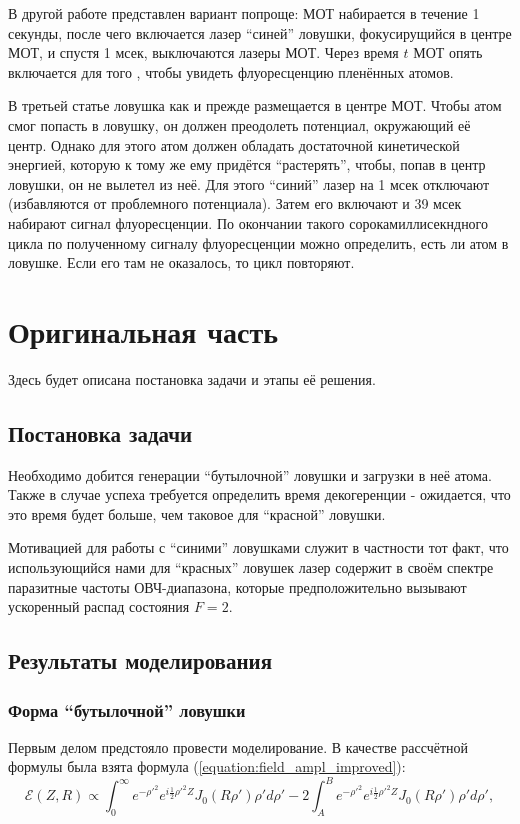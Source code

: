 \documentclass[12pt]{article}
\begin{document}
        В другой работе\cite{isenhower2009atom} представлен вариант попроще: МОТ набирается в течение 1 секунды,
        после чего включается лазер \enquote{синей} ловушки, фокусирущийся в центре МОТ, и спустя 1 мсек,
        выключаются лазеры МОТ. Через время $t$ МОТ опять включается для того , чтобы увидеть флуоресценцию
        пленённых атомов.

        В третьей статье\cite{xu2010trapping} ловушка как и прежде размещается в центре МОТ. Чтобы атом смог попасть
        в ловушку, он должен преодолеть потенциал, окружающий её центр. Однако для этого атом должен обладать
        достаточной кинетической энергией, которую к тому же ему придётся \enquote{растерять}, чтобы, попав в центр ловушки,
        он не вылетел из неё. Для этого \enquote{синий} лазер на 1 мсек отключают (избавляются от проблемного потенциала).
        Затем его включают и 39 мсек набирают сигнал флуоресценции. По окончании такого сорокамиллисекндного цикла
        по полученному сигналу флуоресценции можно определить, есть ли атом в ловушке. Если его там не оказалось,
        то цикл повторяют.

    
    \section{Оригинальная часть}
        Здесь будет описана постановка задачи и этапы её решения.

        \subsection{Постановка задачи}
        Необходимо добится генерации \enquote{бутылочной} ловушки и загрузки в неё атома. Также в случае успеха
        требуется определить время декогеренции - ожидается, что это время будет больше, чем таковое для
        \enquote{красной} ловушки.

        Мотивацией для работы с \enquote{синими} ловушками служит в частности тот факт, что использующийся нами для
        \enquote{красных} ловушек лазер содержит в своём спектре паразитные частоты ОВЧ-диапазона, которые предположительно
        вызывают ускоренный распад состояния $F=2$.

        \subsection{Результаты моделирования}
        \subsubsection{Форма \enquote{бутылочной} ловушки}
        Первым делом предстояло провести моделирование. В качестве рассчётной формулы была взята формула
        (\ref{equation:field_ampl_improved}):
        \begin{equation*}
            \mathcal{E}(Z, R) \propto \int_0^\infty e^{-\rho'^2}e^{i\frac12\rho'^2Z}
            J_0(R\rho')\rho'd\rho' - 
            2\int_A^B e^{-\rho'^2}e^{i\frac12\rho'^2Z}
            J_0(R\rho')\rho'd\rho',
        \end{equation*}
\end{document}

